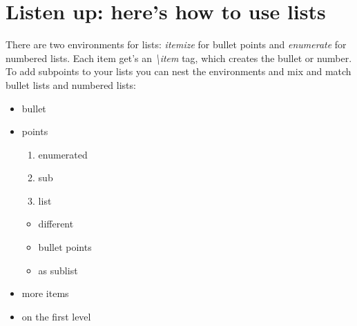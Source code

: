 \section{Listen up: here's how to use lists}

There are two environments for lists: \textit{itemize} for bullet points and \textit{enumerate} for numbered lists. Each item get's an \textit{\textbackslash item} tag, which creates the bullet or number.
To add subpoints to your lists you can nest the environments and mix and match bullet lists and numbered lists:\\

\begin{itemize}
    \item bullet
    \item points
    \begin{enumerate}
        \item enumerated
        \item sub
        \item list
    \end{enumerate}
    \begin{itemize}
        \item different
        \item bullet points
        \item as sublist
    \end{itemize}
    \item more items
    \item on the first level
\end{itemize}